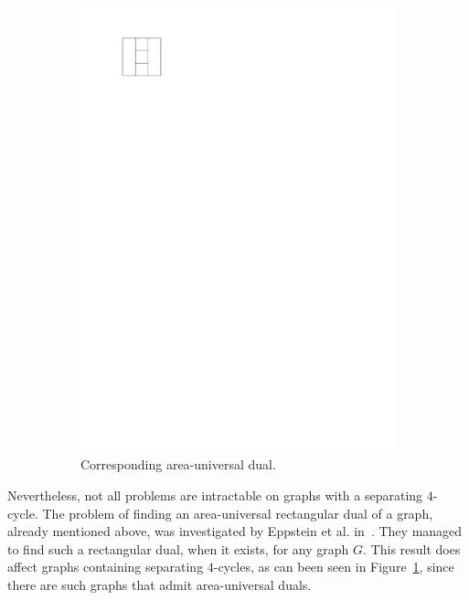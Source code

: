 \begin{figure}
\begin{subfigure}[t]{3cm}
        \includegraphics[scale=1]{introduction/img/areaunivDual.pdf}
        \caption{Corresponding area-universal dual.}
      \end{subfigure}
    \caption{}
    \label{fig:intro:areauniv}
  \end{figure}

  Nevertheless, not all problems are intractable on graphs with a separating $4$-cycle. The problem of finding an area-universal rectangular dual of a graph, already mentioned above, was investigated by Eppstein et al. in~\cite{Eppstein2012}. They managed to find such a rectangular dual, when it exists, for any graph $G$. This result does affect graphs containing separating $4$-cycles, as can been seen in Figure~\ref{fig:intro:areauniv}, since there are such graphs that admit area-universal duals.


